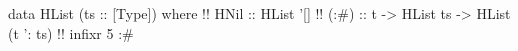 \begin{code}
data HList (ts :: [Type]) where !!
  HNil :: HList '[]  !!
  (:#) :: t -> HList ts -> HList (t ': ts)  !!
infixr 5 :#
\end{code}
